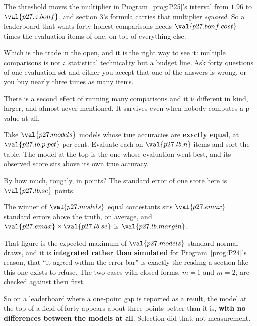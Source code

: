 \begin{fr}

The threshold moves the multiplier in Program~\ref{prog:P25}'s interval from
$\num{1.96}$ to $\val{p27.z.bonf}$, and section 3's formula carries
that multiplier \emph{squared}. So a leaderboard that wants forty honest
comparisons needs $\val{p27.bonf.cost}$ times the evaluation items of one,
on top of everything else.

Which is the trade in the open, and it is the right way to see it: multiple
comparisons is not a statistical technicality but a budget line. Ask forty
questions of one evaluation set and either you accept that one of the answers
is wrong, or you buy nearly three times as many items.
\end{fr}

\begin{fr}
There is a second effect of running many comparisons and it is different in
kind, larger, and almost never mentioned. It survives even when nobody
computes a p-value at all.

Take $\val{p27.models}$ models whose true accuracies are \textbf{exactly
equal}, at $\val{p27.lb.p.pct}$ per cent. Evaluate each on
$\val{p27.lb.n}$ items and sort the table. The model
at the top is the one whose evaluation went best, and its observed score sits
above its own true accuracy.

By how much, roughly, in points? The standard error of one score here is
$\val{p27.lb.se}$ points.
\dotline
\nextframe
\end{fr}

\begin{fr}

The winner of $\val{p27.models}$ equal contestants sits
$\val{p27.emax}$ standard errors above the truth, on average, and
$\val{p27.emax} \times \val{p27.lb.se}$ is $\val{p27.lb.margin}$.

That figure is the expected maximum of $\val{p27.models}$ standard normal
draws, and it is \textbf{integrated rather than simulated} \dash{} for
Program~\ref{prog:P24}'s reason, that \enquote{it agreed within the error
bar} is exactly the reading a section like this one exists to refuse. The
two cases with closed forms, $m = 1$ and $m = 2$, are checked against them
first.


So on a leaderboard where a one-point gap is reported as a result, the model
at the top of a field of forty appears about three points better than it is,
\textbf{with no differences between the models at all}. Selection did that,
not measurement.
\end{fr}

